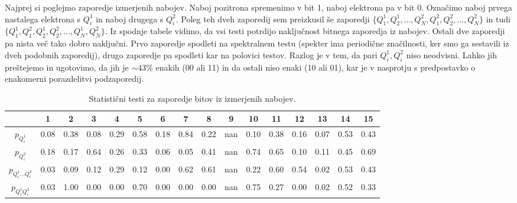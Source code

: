 \documentclass[11pt, oneside]{article}
\theoremstyle{definition}
\begin{document}
Najprej si poglejmo zaporedje izmerjenih nabojev. Naboj pozitrona spremenimo v bit 1, naboj elektrona pa v bit 0.
Označimo naboj prvega nastalega elektrona s $Q^1_i$ in naboj drugega s $Q^2_i$. Poleg teh dveh zaporedij sem preizkusil še
zaporedji $\{Q_1^1, Q_2^1, \ldots, Q_N^2, Q_1^2, Q_2^2, \ldots, Q_N^2 \}$ in tudi
$\{Q_1^1, Q_1^2, Q_2^1, Q_2^2, \ldots, Q_N^1, Q_N^2 \}$. Iz spodnje tabele vidimo, da vsi testi potrdijo naključnost
bitnega zaporedja iz nabojev. Ostali dve zaporedji pa nista več tako dobro naključni.
Prvo zaporedje spodleti na spektralnem testu (spekter ima periodične značilnosti, ker smo ga sestavili iz dveh podobnih zaporedij),
drugo zaporedje pa spodleti kar na polovici testov. Razlog je v tem, da pari $Q_i^1, Q_i^2$ niso neodvisni. Lahko jih preštejemo in ugotovimo, da jih je
$\sim 43 \%$ enakih (00 ali 11) in da ostali niso enaki (10 ali 01), kar je v nasprotju s predpostavko
o enakomerni porazdelitvi podzaporedij.

\begin{table}[h!]
    \begin{center}
        \hspace*{-1.7cm}
        \begin{tabular}{cccccccccccccccc}
            \toprule
            {}                      & 1                       & 2                       & 3                       & 4                       & 5    & 6                       & 7                       & 8    & 9    & 10   & 11   & 12   & 13   & 14   & 15   \\
            \midrule
            \rowcolor{green!40}
            $p_{Q^1_i}$             & 0.08                    & 0.38                    & 0.08                    & 0.29                    & 0.58 & 0.18                    & 0.84                    & 0.22 & nan  & 0.10 & 0.38 & 0.16 & 0.07 & 0.53 & 0.43 \\
            \rowcolor{green!40}
            $p_{Q^2_i}$             & 0.18                    & 0.17                    & 0.64                    & 0.26                    & 0.33 & 0.06                    & 0.05                    & 0.41 & nan  & 0.74 & 0.65 & 0.10 & 0.11 & 0.45 & 0.69 \\
            $p_{Q^1_i\ldots Q^2_i}$ & 0.03                    & 0.09                    & 0.12                    & 0.29                    & 0.12 & \cellcolor{red!40} 0.00 & 0.62                    & 0.61 & nan  & 0.22 & 0.60 & 0.54 & 0.02 & 0.53 & 0.43 \\
            $p_{Q^1_i Q^2_i}$       & 0.03                    & 1.00                    & \cellcolor{red!40} 0.00 & \cellcolor{red!40} 0.00 & 0.70
                                    & \cellcolor{red!40} 0.00 & \cellcolor{red!40} 0.00 & \cellcolor{red!40} 0.00 & nan                     & 0.75 & 0.27                    & \cellcolor{red!40} 0.00 & 0.02 & 0.52 & 0.33                                    \\
            \bottomrule
        \end{tabular}
    \end{center}
    \caption{Statistični testi za zaporedje bitov iz izmerjenih nabojev.}
    \label{tab: 4}
\end{table}
\end{document}
